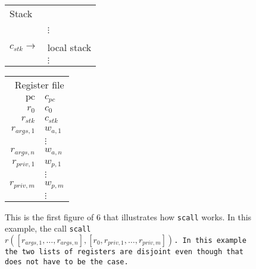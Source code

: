 \documentclass[a4paper]{article}
\newcommand{\var}[1]{\mathit{#1}}
\newcommand{\pc}{\mathit{pc}}
\newcommand{\pcreg}{\mathrm{pc}}
\begin{document}
\begin{figure}
  \label{fig:stack-before-call}
  \centering
  \begin{tabular}[!h]{r | >{\raggedright\arraybackslash}p{3cm} |}
    \multicolumn{2}{l}{Stack} \\
    \cline{2-2}
 & \\
 & $\vdots$\\
    \cline{2-2}
 & 0 \\
    \cline{2-2}
    $c_{\var{stk}} \rightarrow$   & local stack\\
 & $\vdots$\\
    \cline{2-2}
  \end{tabular}
  \hspace{1cm}
  \begin{tabular}{r | >{\centering\arraybackslash}p{0.75cm} |}
    \multicolumn{2}{r}{Register file} \\
    \cline{2-2}
    $\pcreg$ & $c_{\pc}$\\
    \cline{2-2}
    $r_0$  & $c_0$ \\
    \cline{2-2}
    $r_{\var{stk}}$  & $c_{\var{stk}}$ \\
    \cline{2-2}
    $r_{\var{args},1}$ & $w_{a,1}$ \\
    \cline{2-2}
             & $\vdots$ \\
    \cline{2-2}
    $r_{\var{args},n}$ & $w_{a,n}$\\
    \cline{2-2}
    $r_{\var{priv},1}$ & $w_{p,1}$\\
    \cline{2-2}
             & $\vdots$ \\
    \cline{2-2}
    $r_{\var{priv},m}$ & $w_{p,m}$\\
    \cline{2-2}
             & $\vdots$ \\
    \cline{2-2}
  \end{tabular}
  \caption{This is the first figure of 6 that illustrates how \texttt{scall} works. In this example, the call \texttt{scall $r([r_{\var{args},1},\dots,r_{\var{args},n}],[r_0,r_{\var{priv},1},\dots,r_{\var{priv},m}])$. In this example the two lists of registers are disjoint even though that does not have to be the case.}}
\end{figure}
\end{document}

